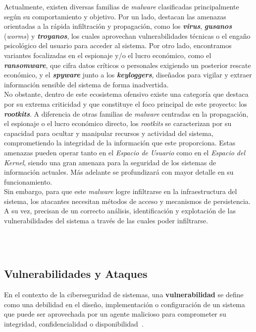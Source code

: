Actualmente, existen diversas familias de \textit{malware} clasificadas principalmente según su comportamiento y objetivo.
Por un lado, destacan las amenazas orientadas a la rápida infiltración y propagación, como los \textbf{\textit{virus}}, \textbf{\textit{gusanos}} (\textit{worms}) y \textbf{\textit{troyanos}}, los cuales aprovechan vulnerabilidades técnicas o el engaño psicológico del usuario para acceder al sistema.
Por otro lado, encontramos variantes focalizadas en el espionaje y/o el lucro económico, como el \textbf{\textit{ransomware}}, que cifra datos críticos o personales exigiendo un posterior rescate económico, y el \textbf{\textit{spyware}} junto a los \textbf{\textit{keyloggers}}, diseñados para vigilar y extraer información sensible del sistema de forma inadvertida.\\

No obstante, dentro de este ecosistema ofensivo existe una categoría que destaca por su extrema criticidad y que constituye el foco principal de este proyecto: los \textbf{\textit{rootkits}}.
A diferencia de otras familias de \textit{malware} centradas en la propagación, el espionaje o el lucro económico directo, los \textit{rootkits} se caracterizan por su capacidad para ocultar y manipular recursos y actividad del sistema, comprometiendo la integridad de la información que este proporciona.
Estas amenazas pueden operar tanto en el \textit{Espacio de Usuario} como en el \textit{Espacio del Kernel}, siendo una gran amenaza para la seguridad de los sistemas de información actuales.
Más adelante se profundizará con mayor detalle en su funcionamiento.\\

Sin embargo, para que este \textit{malware} logre infiltrarse en la infraestructura del sistema, los atacantes necesitan métodos de acceso y mecanismos de persistencia.
A su vez, precisan de un correcto análisis, identificación y explotación de las vulnerabilidades del sistema a través de las cuales poder infiltrarse.\\

\

\

\subsection{Vulnerabilidades y Ataques}
\label{sec:ataques}

En el contexto de la ciberseguridad de sistemas, una \textbf{vulnerabilidad} se define como una debilidad en el diseño, implementación o configuración de un sistema que puede ser aprovechada por un agente malicioso para comprometer su integridad, confidencialidad o disponibilidad~\cite{threat_enisa}.\\

